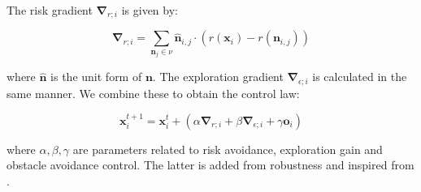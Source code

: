 The risk gradient $\bm{\nabla}_{r;i}$ is given by:

\begin{equation}
    \bm{\nabla}_{r;i} = \sum_{\bm{n}_j \in \nu}\bm{\hat{n}}_{i,j} \cdot (r(\bm{x}_i) - r(\bm{n}_{i,j}))
    \label{eq:gradient}
\end{equation}

where $\bm{\hat{n}}$ is the unit form of $\bm{n}$. The exploration gradient $\bm{\nabla}_{\epsilon;i}$ is calculated in the same manner. We combine these to obtain the control law:

\begin{equation}
    \bm{x}_i^{t+1} = \bm{x}_i^t + (\alpha\bm{\nabla}_{r;i} + \beta\bm{\nabla}_{\epsilon;i} + \gamma\bm{o}_i)
    \label{eq:control_law}
\end{equation}

where $\alpha, \beta, \gamma$ are parameters related to risk avoidance, exploration gain and obstacle avoidance control. The latter is added from robustness and inspired from \cite{shahriari2018lightweight}.

